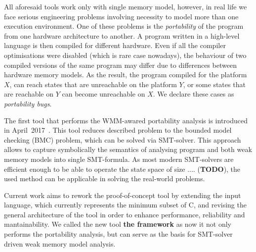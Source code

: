 All aforesaid tools work only with single memory model, however, in real life we face serious engineering problems involving necessity to model more than one execution environment. One of these problems is the \textit{portability} of the program from one hardware architecture to another. A program written in a high-level language is then compiled for different hardware. Even if all the compiler optimisations were disabled (which is rare case nowadays), the behaviour of two compiled versions of the same program may differ due to differences between hardware memory models. As the result, the program compiled for the platform $X$, can reach states that are unreachable on the platform $Y$, or some states that are reachable on $Y$ can become unreachable on $X$. We declare these cases as \textit{portability bugs}.

The first tool that performs the WMM-awared portability analysis is  introduced in April~2017~\cite{Porthos17}. This tool reduces described problem to the bounded model checking (BMC) problem, which can be solved via SMT-solver. This approach allows to capture symbolically the semantics of analysing program and both weak memory models into single SMT-formula. As most modern SMT-solvers are efficient enough to be able to operate the state space of size .... (\textbf{TODO}), the used method can be applicable in solving the real-world problems.



Current work aims to rework the proof-of-concept tool  by extending the input language, which currently represents the minimum subset of C, and revising the general architecture of the tool in order to enhance performance, reliability and mantainability.
We called the new tool \textbf{the  framework} as now it not only performs the portability analysis, but can serve as the basis for SMT-solver driven weak memory model analysis.

